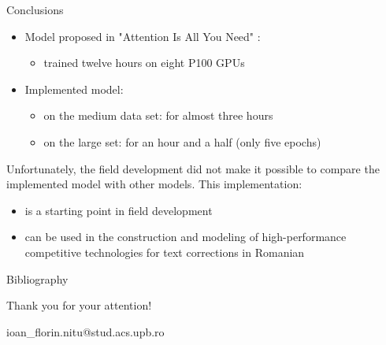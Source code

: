 \documentclass[]{beamer}
\begin{document}
        \begin{frame}{Conclusions}
            
            \begin{itemize}
                \item Model proposed in "Attention Is All You Need" \cite{vaswani2017attention}:
                \begin{itemize}
                    \item trained twelve hours on eight P100 GPUs
                \end{itemize}
                \item Implemented model:
                \begin{itemize}
                    \item on the medium data set: for almost three hours
                    \item on the large set: for an hour and a half (only five epochs)
                \end{itemize}
            \end{itemize}
            Unfortunately, the field development did not make it possible to compare the implemented model with other models.
            This implementation:
            \begin{itemize}
                \item is a starting point in field development
                \item can be used in the construction and modeling of high-performance competitive technologies for text corrections in Romanian
            \end{itemize}
        
        \end{frame}
        
    \begin{frame}{Bibliography}
        
        
        
    \end{frame}
    
    \begin{frame}{Thank you for your attention!}
        
        \begin{center}
            ioan\_florin.nitu@stud.acs.upb.ro
        \end{center}

    \end{frame}
    
\end{document}
